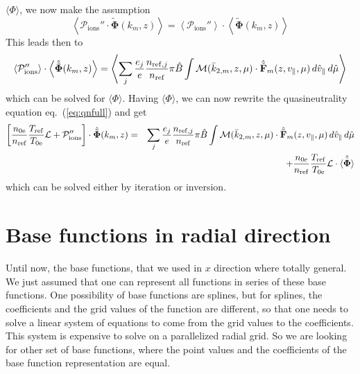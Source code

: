 $\langle\Phi\rangle$, we now make the assumption 
\begin{displaymath}
  \left\langle\mathcal{P}_{\mathrm{ions}}''\cdot\tilde{\mathbf{\Phi}}(k_m,z)
  \right\rangle=\left\langle\mathcal{P}_{\mathrm{ions}}''\right\rangle\cdot\left\langle\tilde{\mathbf{\Phi}}(k_m,z)\right\rangle
\end{displaymath}
This leads then to 
\begin{displaymath}
\left\langle\mathcal{P}_{\mathrm{ions}}''\right\rangle\cdot\left\langle\hat{\tilde{\mathbf{\Phi}}}(k_m,z)\right\rangle
  = \left\langle\sum_j \frac{e_j}{e} \frac{n_{\mathrm{ref},j}}{n_{\mathrm{ref}}} \pi\hat{B}\int 
  \mathcal{M}(\bar{k}_{2,m},z,\mu)\cdot\hat{\tilde{\mathbf{F}}}_m(z,v_\|,\mu)\,d\hat{v}_\|\,d\hat{\mu}\right\rangle
 \end{displaymath}
which can be solved for $\langle\Phi\rangle$.
Having $\langle\Phi\rangle$, we can now rewrite the quasineutrality equation eq.~(\ref{eq:qnfull}) and get
\begin{eqnarray*}
  \left[\frac{n_{0\mathrm{e}}}{n_{\mathrm{ref}}} \frac{T_{\mathrm{ref}}}{T_{0\mathrm{e}}} \mathcal{L}
  +\mathcal{P}_{\mathrm{ions}}''\right]\cdot \hat{\tilde{\mathbf{\Phi}}}(k_m,z)    
& = & \sum_j \frac{e_j}{e} \frac{n_{\mathrm{ref},j}}{n_{\mathrm{ref}}} \pi\hat{B}\int 
  \mathcal{M}(\bar{k}_{2,m},z,\mu)\cdot\hat{\tilde{\mathbf{F}}}_m(z,v_\|,\mu)\,d\hat{v}_\|\,d\hat{\mu} \\
& &  +\frac{n_{0\mathrm{e}}}{n_{\mathrm{ref}}} \frac{T_{\mathrm{ref}}}{T_{0\mathrm{e}}} \mathcal{L}\cdot
   \hat{\tilde{\mathbf{\langle\Phi\rangle}}}
\end{eqnarray*} 
which can be solved either by iteration or inversion.

\section{Base functions in radial direction}
\label{sec:basefunc}
Until now, the base functions, that we used in $x$ direction where
totally general. We just assumed that one can represent all functions
in series of these base functions. One possibility of base functions
are splines, but for splines, the coefficients and the grid values of
the function are different, so that one needs to solve a linear system
of equations to come from the grid values to the coefficients. This
system is expensive to solve on a parallelized radial grid. So we are
looking for other set of base functions, where the point values and
the coefficients of the base function representation are
equal. 

